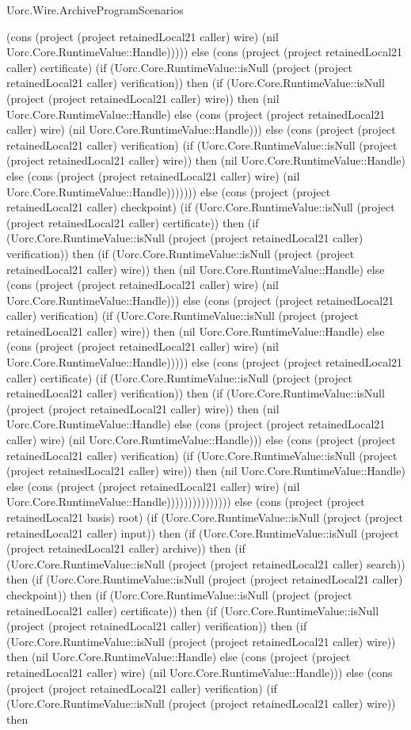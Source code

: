\begin{lexlean}{Uorc.Wire.ArchiveProgramScenarios}
\begin{semanticmodule}
{(cons (project (project retainedLocal21 caller) wire) (nil Uorc.Core.RuntimeValue::Handle))))) else (cons (project (project retainedLocal21 caller) certificate) (if (Uorc.Core.RuntimeValue::isNull (project (project retainedLocal21 caller) verification)) then (if (Uorc.Core.RuntimeValue::isNull (project (project retainedLocal21 caller) wire)) then (nil Uorc.Core.RuntimeValue::Handle) else (cons (project (project retainedLocal21 caller) wire) (nil Uorc.Core.RuntimeValue::Handle))) else (cons (project (project retainedLocal21 caller) verification) (if (Uorc.Core.RuntimeValue::isNull (project (project retainedLocal21 caller) wire)) then (nil Uorc.Core.RuntimeValue::Handle) else (cons (project (project retainedLocal21 caller) wire) (nil Uorc.Core.RuntimeValue::Handle))))))) else (cons (project (project retainedLocal21 caller) checkpoint) (if (Uorc.Core.RuntimeValue::isNull (project (project retainedLocal21 caller) certificate)) then (if (Uorc.Core.RuntimeValue::isNull (project (project retainedLocal21 caller) verification)) then (if (Uorc.Core.RuntimeValue::isNull (project (project retainedLocal21 caller) wire)) then (nil Uorc.Core.RuntimeValue::Handle) else (cons (project (project retainedLocal21 caller) wire) (nil Uorc.Core.RuntimeValue::Handle))) else (cons (project (project retainedLocal21 caller) verification) (if (Uorc.Core.RuntimeValue::isNull (project (project retainedLocal21 caller) wire)) then (nil Uorc.Core.RuntimeValue::Handle) else (cons (project (project retainedLocal21 caller) wire) (nil Uorc.Core.RuntimeValue::Handle))))) else (cons (project (project retainedLocal21 caller) certificate) (if (Uorc.Core.RuntimeValue::isNull (project (project retainedLocal21 caller) verification)) then (if (Uorc.Core.RuntimeValue::isNull (project (project retainedLocal21 caller) wire)) then (nil Uorc.Core.RuntimeValue::Handle) else (cons (project (project retainedLocal21 caller) wire) (nil Uorc.Core.RuntimeValue::Handle))) else (cons (project (project retainedLocal21 caller) verification) (if (Uorc.Core.RuntimeValue::isNull (project (project retainedLocal21 caller) wire)) then (nil Uorc.Core.RuntimeValue::Handle) else (cons (project (project retainedLocal21 caller) wire) (nil Uorc.Core.RuntimeValue::Handle))))))))))))))) else (cons (project (project retainedLocal21 basis) root) (if (Uorc.Core.RuntimeValue::isNull (project (project retainedLocal21 caller) input)) then (if (Uorc.Core.RuntimeValue::isNull (project (project retainedLocal21 caller) archive)) then (if (Uorc.Core.RuntimeValue::isNull (project (project retainedLocal21 caller) search)) then (if (Uorc.Core.RuntimeValue::isNull (project (project retainedLocal21 caller) checkpoint)) then (if (Uorc.Core.RuntimeValue::isNull (project (project retainedLocal21 caller) certificate)) then (if (Uorc.Core.RuntimeValue::isNull (project (project retainedLocal21 caller) verification)) then (if (Uorc.Core.RuntimeValue::isNull (project (project retainedLocal21 caller) wire)) then (nil Uorc.Core.RuntimeValue::Handle) else (cons (project (project retainedLocal21 caller) wire) (nil Uorc.Core.RuntimeValue::Handle))) else (cons (project (project retainedLocal21 caller) verification) (if (Uorc.Core.RuntimeValue::isNull (project (project retainedLocal21 caller) wire)) then }
\end{semanticmodule}
\end{lexlean}
